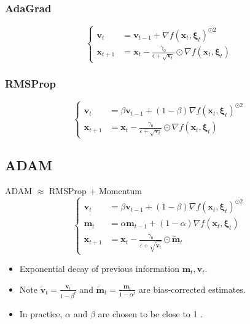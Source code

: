 \subsubsection*{AdaGrad}
$$
\begin{cases}\mathbf{v}_{t} & =\mathbf{v}_{t-1}+\nabla f\left(\mathbf{x}_{t}, \boldsymbol{\xi}_{t}\right)^{\odot 2} \\ \mathbf{x}_{t+1} & =\mathbf{x}_{t}-\frac{\gamma_{0}}{\epsilon+\sqrt{\mathbf{v}_{t}}} \odot \nabla f\left(\mathbf{x}_{t}, \boldsymbol{\xi}_{t}\right)\end{cases}
$$
\subsubsection*{RMSProp}
$$
\begin{cases}\mathbf{v}_{t} & =\beta \mathbf{v}_{t-1}+(1-\beta) \nabla f\left(\mathbf{x}_{t}, \boldsymbol{\xi}_{t}\right)^{\odot 2} \\ \mathbf{x}_{t+1} & =\mathbf{x}_{t}-\frac{\gamma_{0}}{\varepsilon+\sqrt{\mathbf{v}_{t}}} \odot \nabla f\left(\mathbf{x}_{t}, \boldsymbol{\xi}_{t}\right)\end{cases}
$$



\subsection*{ADAM}
ADAM $\approx$ RMSProp + Momentum
$$
\begin{cases}\mathbf{v}_{t} & =\beta \mathbf{v}_{t-1}+(1-\beta) \nabla f\left(\mathbf{x}_{t}, \boldsymbol{\xi}_{t}\right)^{\odot 2} \\ \mathbf{m}_{t} & =\alpha \mathbf{m}_{t-1}+(1-\alpha) \nabla f\left(\mathbf{x}_{t}, \boldsymbol{\xi}_{t}\right) \\ \mathbf{x}_{t+1} & =\mathbf{x}_{t}-\frac{\gamma_{0}}{\varepsilon+\sqrt{\tilde{\mathbf{v}}_{t}}} \odot \tilde{\mathbf{m}}_{t}\end{cases}
$$
\begin{itemize}[leftmargin=*]
    \item Exponential decay of previous information $\mathbf{m}_{t}, \mathbf{v}_{t}$.
    \item Note $\tilde{\mathbf{v}}_{t}=\frac{\mathbf{v}_{t}}{1-\beta^{t}}$ and $\tilde{\mathbf{m}}_{t}=\frac{\mathbf{m}_{t}}{1-\alpha^{t}}$ are bias-corrected estimates.
    \item In practice, $\alpha$ and $\beta$ are chosen to be close to 1 .
\end{itemize}





